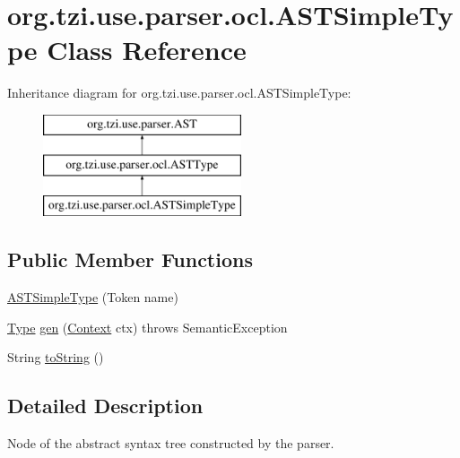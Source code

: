 \hypertarget{classorg_1_1tzi_1_1use_1_1parser_1_1ocl_1_1_a_s_t_simple_type}{\section{org.\-tzi.\-use.\-parser.\-ocl.\-A\-S\-T\-Simple\-Type Class Reference}
\label{classorg_1_1tzi_1_1use_1_1parser_1_1ocl_1_1_a_s_t_simple_type}
}
Inheritance diagram for org.\-tzi.\-use.\-parser.\-ocl.\-A\-S\-T\-Simple\-Type\-:\begin{figure}[H]
\begin{center}
\leavevmode
\includegraphics[height=3.000000cm]{classorg_1_1tzi_1_1use_1_1parser_1_1ocl_1_1_a_s_t_simple_type}
\end{center}
\end{figure}
\subsection*{Public Member Functions}
\begin{DoxyCompactItemize}
\item 
\hyperlink{classorg_1_1tzi_1_1use_1_1parser_1_1ocl_1_1_a_s_t_simple_type_a1d10c09c382393f5cd723858645e11a6}{A\-S\-T\-Simple\-Type} (Token name)
\item 
\hyperlink{interfaceorg_1_1tzi_1_1use_1_1uml_1_1ocl_1_1type_1_1_type}{Type} \hyperlink{classorg_1_1tzi_1_1use_1_1parser_1_1ocl_1_1_a_s_t_simple_type_a065f1ccfd56d21c49d41601bb5933a58}{gen} (\hyperlink{classorg_1_1tzi_1_1use_1_1parser_1_1_context}{Context} ctx)  throws Semantic\-Exception 
\item 
String \hyperlink{classorg_1_1tzi_1_1use_1_1parser_1_1ocl_1_1_a_s_t_simple_type_a89c48065815cab662e7b1c79805f6854}{to\-String} ()
\end{DoxyCompactItemize}


\subsection{Detailed Description}
Node of the abstract syntax tree constructed by the parser.

